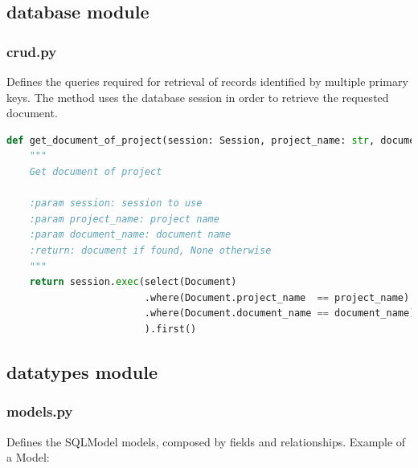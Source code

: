 \documentclass[12pt]{report}
\begin{document}
\subsection{database module}

\subsubsection{crud.py}
Defines the queries required for retrieval of records identified by multiple primary keys.
The method uses the database session in order to retrieve the requested document.

\begin{lstlisting}[language=Python, caption=Get document of project]
def get_document_of_project(session: Session, project_name: str, document_name: str):
    """
    Get document of project

    :param session: session to use
    :param project_name: project name
    :param document_name: document name
    :return: document if found, None otherwise
    """
    return session.exec(select(Document)
                        .where(Document.project_name  == project_name)
                        .where(Document.document_name == document_name)
                        ).first()
\end{lstlisting}

\subsection{datatypes module}

\subsubsection{models.py}
Defines the SQLModel models, composed by fields and relationships. 
Example of a Model:
\end{document}
